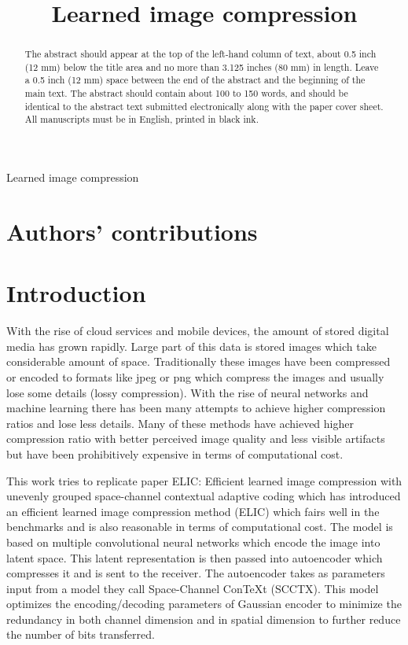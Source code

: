 \documentclass{article}
\title{Learned image compression}
\begin{document}
%
\maketitle
%
\begin{abstract}
The abstract should appear at the top of the left-hand column of text, about
0.5 inch (12 mm) below the title area and no more than 3.125 inches (80 mm) in
length.  Leave a 0.5 inch (12 mm) space between the end of the abstract and the
beginning of the main text.  The abstract should contain about 100 to 150
words, and should be identical to the abstract text submitted electronically
along with the paper cover sheet.  All manuscripts must be in English, printed
in black ink.
\end{abstract}
%
\begin{keywords}
Learned image compression
\end{keywords}
%

\setcounter{section}{-1}

\section{Authors' contributions}

\section{Introduction} %
\label{sec:intro}
With the rise of cloud services and mobile devices, the amount of stored digital media has grown rapidly. 
Large part of this data is stored images which take considerable amount of space.
Traditionally these images have been compressed or encoded to formats like jpeg or png which compress the images and usually lose some details (lossy compression).
With the rise of neural networks and machine learning there has been many attempts to achieve higher compression ratios and lose less details.
Many of these methods have achieved higher compression ratio with better perceived image quality and less visible artifacts but have been prohibitively expensive in terms of computational cost.

This work tries to replicate paper ELIC: Efficient learned image compression with unevenly grouped space-channel contextual adaptive coding \cite{ELIC} which has introduced an efficient learned image compression method (ELIC) which fairs well in the benchmarks and is also reasonable in terms of computational cost.
The model is based on multiple convolutional neural networks which encode the image into latent space.
This latent representation is then passed into autoencoder which compresses it and is sent to the receiver. 
The autoencoder takes as parameters input from a model they call Space-Channel ConTeXt (SCCTX).
This model optimizes the encoding/decoding parameters of Gaussian encoder to minimize the redundancy in both channel dimension and in spatial dimension to further reduce the number of bits transferred.
\end{document}
